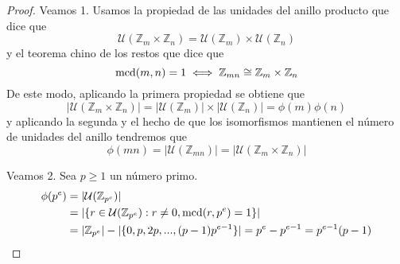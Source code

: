 \begin{proof}
Veamos 1. Usamos la propiedad de las unidades del anillo producto que dice que $$\mathcal U(\mathbb{Z}_m \times \mathbb{Z}_n) = \mathcal U(\mathbb{Z}_m) \times \mathcal U(\mathbb{Z}_n)$$ y el teorema chino de los restos que dice que $$\operatorname*{mcd}(m,n) = 1 \iff \mathbb{Z}_{mn} \cong \mathbb{Z}_m \times \mathbb{Z}_n$$ De este modo, aplicando la primera propiedad se obtiene que $$|\mathcal U(\mathbb{Z}_m \times \mathbb{Z}_n)| = |\mathcal U(\mathbb{Z}_m)| \times |\mathcal U(\mathbb{Z}_n)| = \phi(m) \phi(n)$$ y aplicando la segunda y el hecho de que los isomorfismos mantienen el número de unidades del anillo tendremos que $$\phi(mn) = |\mathcal U(\mathbb{Z}_{mn})| = |\mathcal U(\mathbb{Z}_m \times \mathbb{Z}_n)|$$

Veamos 2. Sea $p \ge 1$ un número primo. 
\begin{align*}
    \phi(p^e) &= |\mathcal U(\mathbb{Z}_{p^e})| \\
              &= |\{r \in \mathcal U(\mathbb{Z}_{p^e}) : r \neq 0, \operatorname*{mcd}(r,p^e) = 1\}| \\
              &= |\mathbb{Z}_{p^e}|-|\{0,p,2p,...,(p-1)p^{e-1}\}| = p^e - p^{e-1} = p^{e-1}(p-1)
\end{align*}
\end{proof}
